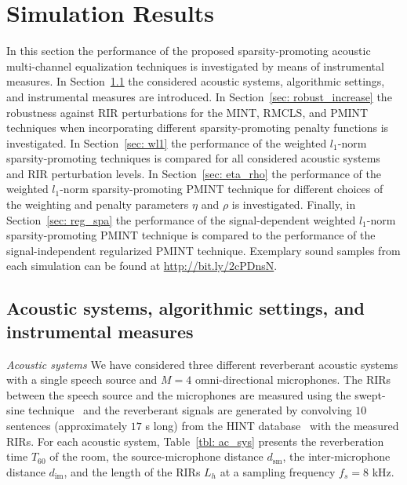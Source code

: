 \documentclass[10pt]{IEEEtran}
\begin{document}
\section{Simulation Results}
\label{sec: exp}
In this section the performance of the proposed sparsity-promoting acoustic multi-channel equalization techniques is investigated by means of instrumental measures.
In Section~\ref{sec: acsys} the considered acoustic systems, algorithmic settings, and instrumental measures are introduced.
In Section~\ref{sec: robust_increase} the robustness against RIR perturbations for the MINT, RMCLS, and PMINT techniques when incorporating different sparsity-promoting penalty functions is investigated.
In Section~\ref{sec: wl1} the performance of the weighted $l_1$-norm sparsity-promoting techniques is compared for all considered acoustic systems and RIR perturbation levels.
In Section~\ref{sec: eta_rho} the performance of the weighted $l_1$-norm sparsity-promoting PMINT technique for different choices of the weighting and penalty parameters $\eta$ and $\rho$ is investigated.
Finally, in Section~\ref{sec: reg_spa} the performance of the signal-dependent weighted $l_1$-norm sparsity-promoting PMINT technique is compared to the performance of the signal-independent regularized PMINT technique.
Exemplary sound samples from each simulation can be found at \url{http://bit.ly/2cPDnsN}.
\subsection{Acoustic systems, algorithmic settings, and instrumental measures}
\label{sec: acsys}
\vskip 5pt
\textit{Acoustic systems} 
\vskip 5pt
We have considered three different reverberant acoustic systems with a single speech source and $M=4$ omni-directional microphones.
The RIRs between the speech source and the microphones are measured using the swept-sine technique~\cite{Farina_2000} and the reverberant signals are generated by convolving $10$ sentences (approximately $17$ s long) from the HINT database~\cite{Nilsson_JASA_1994} with the measured RIRs.
For each acoustic system, Table~\ref{tbl: ac_sys} presents the reverberation time $T_{60}$ of the room, the source-microphone distance $d_{\text{sm}}$, the inter-microphone distance $d_{\text{im}}$, and the length of the RIRs $L_h$ at a sampling frequency $f_{s} = 8$ kHz.
\end{document}

